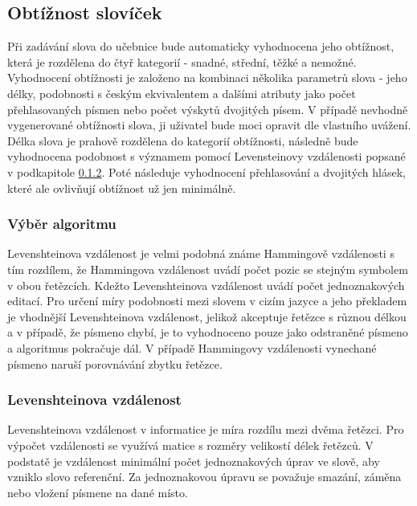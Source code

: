 \documentclass[a4paper,11pt,titlepage,fleqn]{article}
\begin{document}
    \subsection{Obtížnost slovíček}
        Při zadávání slova do učebnice bude automaticky vyhodnocena jeho obtížnost, která je rozdělena do čtyř kategorií - snadné, střední, těžké a nemožné. Vyhodnocení obtížnosti je založeno na kombinaci několika parametrů slova - jeho délky, podobnosti s českým ekvivalentem a dalšími atributy jako počet přehlasovaných písmen nebo počet výskytů dvojitých písem. V případě nevhodně vygenerované obtížnosti slova, ji uživatel bude moci opravit dle vlastního uvážení. Délka slova je prahově rozdělena do kategorií obtížnosti, následně bude vyhodnocena podobnost s významem pomocí Levensteinovy vzdálenosti popsané v podkapitole \ref{levenstein}. Poté následuje vyhodnocení přehlasování a dvojitých hlásek, které ale ovlivňují obtížnost už jen minimálně.

        \subsubsection{Výběr algoritmu}       
            Levenshteinova vzdálenost je velmi podobná známe Hammingově vzdálenosti s tím rozdílem, že Hammingova vzdálenost uvádí počet pozic se stejným symbolem v obou řetězcích. Kdežto Levenshteinova vzdálenost uvádí počet jednoznakových editací. Pro určení míry podobnosti mezi slovem v cizím jazyce a jeho překladem je vhodnější Levenshteinova vzdálenost, jelikož akceptuje řetězce s různou délkou a v případě, že písmeno chybí, je to vyhodnoceno pouze jako odstraněné písmeno a algoritmus pokračuje dál. V případě Hammingovy vzdálenosti vynechané písmeno naruší porovnávání zbytku řetězce.

        \subsubsection{Levenshteinova vzdálenost}
            \label{levenstein}
            Levenshteinova vzdálenost v informatice je míra rozdílu mezi dvěma řetězci. Pro výpočet vzdálenosti se využívá matice s rozměry velikostí délek řetězců. V podstatě je vzdálenost minimální počet jednoznakových úprav ve slově, aby vzniklo slovo referenční. Za jednoznakovou úpravu se považuje smazání, záměna nebo vložení písmene na dané místo\cite{bib:levensthtein}.
\end{document}
